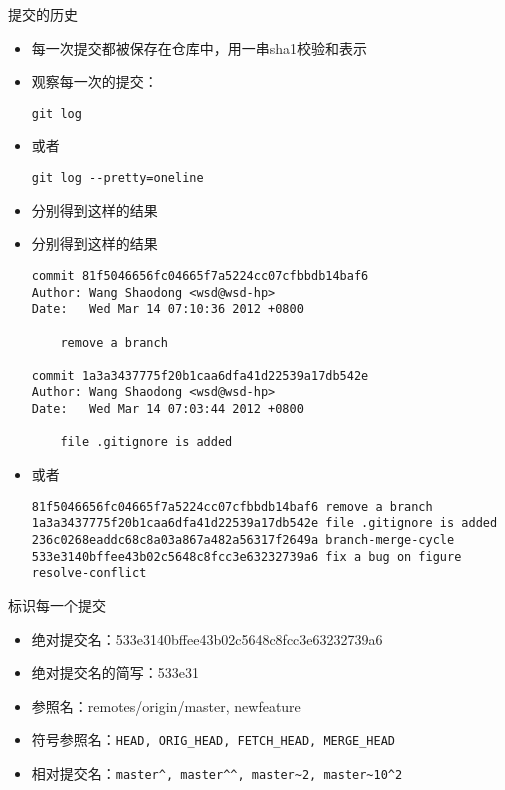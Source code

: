\begin{frame}[<+->][fragile]{提交的历史}
    \begin{itemize}
        \item 每一次提交都被保存在仓库中，用一串sha1校验和表示
        \item 观察每一次的提交：
\begin{Verbatim}[frame=single,commandchars=\\\{\}]
git log
\end{Verbatim}
        \item 或者
\begin{Verbatim}[frame=single,commandchars=\\\{\}]
git log --pretty=oneline
\end{Verbatim}
        \item 分别得到这样的结果
    \end{itemize}
\end{frame}

\begin{frame}[<+->][fragile]{}
    \begin{itemize}
        \item 分别得到这样的结果
\begin{Verbatim}[frame=single,commandchars=\\\{\}]
commit 81f5046656fc04665f7a5224cc07cfbbdb14baf6
Author: Wang Shaodong <wsd@wsd-hp>
Date:   Wed Mar 14 07:10:36 2012 +0800

    remove a branch

commit 1a3a3437775f20b1caa6dfa41d22539a17db542e
Author: Wang Shaodong <wsd@wsd-hp>
Date:   Wed Mar 14 07:03:44 2012 +0800

    file .gitignore is added
\end{Verbatim}

        \item 或者

\begin{Verbatim}[frame=single,commandchars=\\\{\}]
81f5046656fc04665f7a5224cc07cfbbdb14baf6 remove a branch
1a3a3437775f20b1caa6dfa41d22539a17db542e file .gitignore is added
236c0268eaddc68c8a03a867a482a56317f2649a branch-merge-cycle
533e3140bffee43b02c5648c8fcc3e63232739a6 fix a bug on figure resolve-conflict
\end{Verbatim}
    \end{itemize}
\end{frame}

\begin{frame}[<+->][fragile]{标识每一个提交}
    \begin{itemize}
        \item 绝对提交名：533e3140bffee43b02c5648c8fcc3e63232739a6
        \item 绝对提交名的简写：533e31
        \item 参照名：remotes/origin/master, newfeature
        \item 符号参照名：\verb|HEAD, ORIG_HEAD, FETCH_HEAD, MERGE_HEAD|
        \item 相对提交名：\verb|master^, master^^, master~2, master~10^2|
    \end{itemize}
\end{frame}

